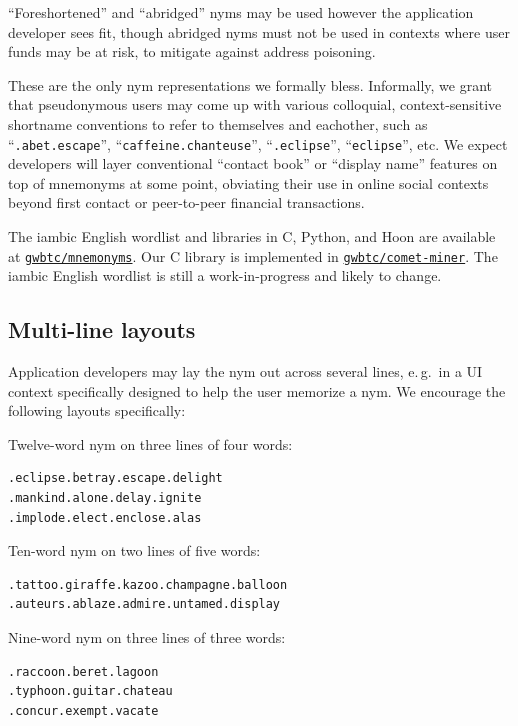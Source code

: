 \documentclass[twoside]{article}
\begin{document}
``Foreshortened'' and ``abridged'' nyms may be used however the
application developer sees fit, though abridged nyms must not be used in
contexts where user funds may be at risk, to mitigate against address poisoning.

These are the only nym representations we formally bless. Informally, we
grant that pseudonymous users may come up with various colloquial,
context-sensitive shortname conventions to refer to themselves and
eachother, such as ``\texttt{.abet.escape}'', ``\texttt{caffeine.chanteuse}'',
``\texttt{.eclipse}'', ``\texttt{eclipse}'', etc. We expect developers will layer
conventional ``contact book'' or ``display name'' features on top of
mnemonyms at some point, obviating their use in online social contexts
beyond first contact or peer-to-peer financial transactions.

The iambic English wordlist and libraries in C, Python, and Hoon are available at
\href{https://github.com/gwbtc/mnemonyms}{\texttt{gwbtc/mnemonyms}}. Our C library is implemented in
\href{https://github.com/gwbtc/comet-miner}{\texttt{gwbtc/comet-miner}}. The
iambic English wordlist is still a work-in-progress and likely to change.

\subsection{Multi-line layouts}\label{multi-line-layouts}

Application developers may lay the nym out across several lines, e.\,g.\ in
a UI context specifically designed to help the user memorize a nym. We
encourage the following layouts specifically:

Twelve-word nym on three lines of four words:

\begin{lstlisting}[style=listingblock]
.eclipse.betray.escape.delight
.mankind.alone.delay.ignite
.implode.elect.enclose.alas
\end{lstlisting}

Ten-word nym on two lines of five words:

\begin{lstlisting}[style=listingblock]
.tattoo.giraffe.kazoo.champagne.balloon
.auteurs.ablaze.admire.untamed.display
\end{lstlisting}

Nine-word nym on three lines of three words:

\begin{lstlisting}[style=listingblock]
.raccoon.beret.lagoon
.typhoon.guitar.chateau
.concur.exempt.vacate
\end{lstlisting}
\end{document}
